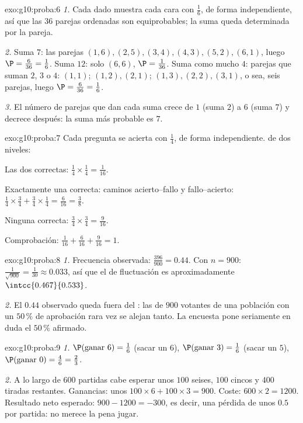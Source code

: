 \begin{solution}{exo:g10:proba:6}
\emph{1.} Cada dado muestra cada cara con  $\frac16$, de forma
independiente, así que las $36$ parejas ordenadas son equiprobables; la
suma queda determinada por la pareja.

\emph{2.} Suma $7$: las parejas $(1,6), (2,5), (3,4), (4,3), (5,2),
(6,1)$, luego $\P = \frac{6}{36} = \frac16$. Suma $12$: solo $(6,6)$,
$\P = \frac{1}{36}$. Suma como mucho $4$: parejas que suman $2$, $3$ o
$4$: $(1,1)$; $(1,2), (2,1)$; $(1,3), (2,2), (3,1)$, o sea, seis parejas,
luego $\P = \frac{6}{36} = \frac16$.

\emph{3.} El número de parejas que dan cada suma crece de $1$ (suma $2$) a
$6$ (suma $7$) y decrece después: la suma más probable es $7$.
\end{solution}

\begin{solution}{exo:g10:proba:7}
Cada pregunta se acierta con  $\frac14$, de forma
independiente.  de dos niveles:

Las dos correctas: $\frac14 \times \frac14 = \frac{1}{16}$.

Exactamente una correcta: caminos acierto--fallo y fallo--acierto:
$\frac14 \times \frac34 + \frac34 \times \frac14 = \frac{6}{16}
= \frac38$.

Ninguna correcta: $\frac34 \times \frac34 = \frac{9}{16}$.

Comprobación: $\frac{1}{16} + \frac{6}{16} + \frac{9}{16} = 1$.
\end{solution}

\begin{solution}{exo:g10:proba:8}
\emph{1.} Frecuencia observada: $\frac{396}{900} = 0.44$. Con $n = 900$:
$\frac{1}{\sqrt{900}} = \frac{1}{30} \approx 0.033$, así que el 
de fluctuación es aproximadamente $\intcc{0.467}{0.533}$.

\emph{2.} El $0.44$ observado queda fuera del : las  de
$900$ votantes de una población con un $50\,\%$ de aprobación rara vez se
alejan tanto. La encuesta pone seriamente en duda el $50\,\%$ afirmado.
\end{solution}

\begin{solution}{exo:g10:proba:9}
\emph{1.} $\P(\text{ganar } 6) = \frac16$ (sacar un $6$),
$\P(\text{ganar } 3) = \frac16$ (sacar un $5$),
$\P(\text{ganar } 0) = \frac46 = \frac23$.

\emph{2.} A lo largo de $600$ partidas cabe esperar unos $100$ seises,
$100$ cincos y $400$ tiradas restantes. Ganancias: unos
$100 \times 6 + 100 \times 3 = 900$. Coste: $600 \times 2 = 1200$.
Resultado neto esperado: $900 - 1200 = -300$, es decir, una pérdida 
de unos $0.5$ por partida: no merece la pena jugar.
\end{solution}

